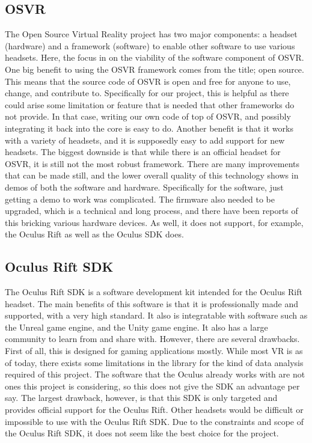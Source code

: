 \documentclass{article}
\begin{document}
\subsection{OSVR}
The Open Source Virtual Reality project has two major components: a headset (hardware) and a framework (software) to enable
other software to use various headsets. Here, the focus in on the viability of the software component of OSVR. 
One big benefit to using the OSVR framework comes from the title; open source. This means that the source code
of OSVR is open and free for anyone to use, change, and contribute to. Specifically for our project, this is helpful
as there could arise some limitation or feature that is needed that other frameworks do not provide. In that case,
writing our own code of top of OSVR, and possibly integrating it back into the core is easy to do. Another benefit
is that it works with a variety of headsets, and it is supposedly easy to add support for new headsets.
The biggest downside is that while there is an official headset for OSVR, it is still not the most robust framework.
There are many improvements that can be made still, and the lower overall quality of this technology shows in demos
of both the software and hardware. Specifically for the software, just getting a demo to work was complicated. The firmware
also needed to be upgraded, which is a technical and long process, and there have been reports of this bricking various
hardware devices. As well, it does not support, for example, the Oculus Rift as well as the Oculus SDK does. \cite{osvrsoft}

\subsection{Oculus Rift SDK} 

The Oculus Rift SDK is a software development kit intended for the Oculus Rift headset.
The main benefits of this software is that it is professionally made and supported, with
a very high standard. It also is integratable with software such as the Unreal game engine,
and the Unity game engine. It also has a large community to learn from and share with. However,
there are several drawbacks. First of all, this is designed for gaming applications mostly. While most
VR is as of today, there exists some limitations in the library for the kind of data analysis required of
this project. The software that the Oculus already works with are not ones this project is considering,
so this does not give the SDK an advantage per say. The largest drawback, however, 
is that this SDK is only targeted and provides official support for the Oculus Rift. 
Other headsets would be difficult or impossible to use with the Oculus Rift SDK.
Due to the constraints and scope of the Oculus Rift SDK, it does not seem like the best choice for the
project. \cite{oculussoft}
\end{document}
